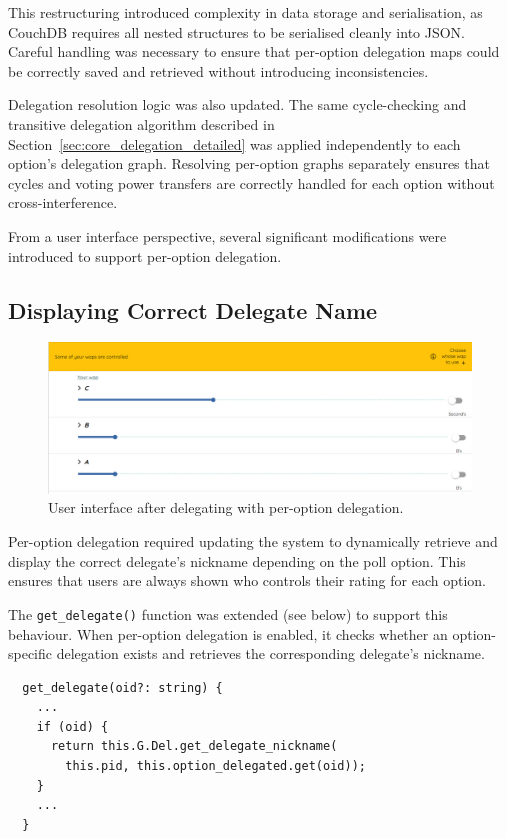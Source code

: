 This restructuring introduced complexity in data storage and serialisation, as CouchDB requires all nested structures to be serialised cleanly into JSON. Careful handling was necessary to ensure that per-option delegation maps could be correctly saved and retrieved without introducing inconsistencies.

Delegation resolution logic was also updated. The same cycle-checking and transitive delegation algorithm described in Section~\ref{sec:core_delegation_detailed} was applied independently to each option's delegation graph. Resolving per-option graphs separately ensures that cycles and voting power transfers are correctly handled for each option without cross-interference.

From a user interface perspective, several significant modifications were introduced to support per-option delegation.

\subsection{Displaying Correct Delegate Name}

\begin{figure}[H]
  \centering
  \includegraphics[width=\textwidth]{../common/peroption/sc.png}
  \caption{User interface after delegating with per-option delegation.}
  \label{fig:per-option-delegation-sc}
\end{figure}

Per-option delegation required updating the system to dynamically retrieve and display the correct delegate's nickname depending on the poll option. This ensures that users are always shown who controls their rating for each option.

The \texttt{get\_delegate()} function was extended (see below) to support this behaviour. When per-option delegation is enabled, it checks whether an option-specific delegation exists and retrieves the corresponding delegate's nickname.

\begin{verbatim}
  get_delegate(oid?: string) {
    ...
    if (oid) {
      return this.G.Del.get_delegate_nickname(
        this.pid, this.option_delegated.get(oid));
    }
    ...
  }
\end{verbatim}

